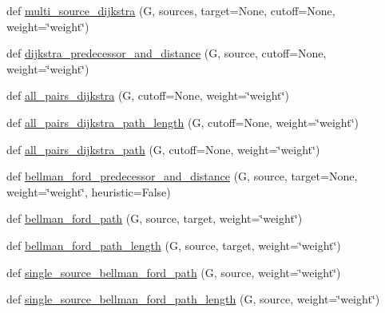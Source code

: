 \begin{DoxyCompactItemize}
def \hyperlink{namespacenetworkx_1_1algorithms_1_1shortest__paths_1_1weighted_aee5f81cc7c6f46d1f11ec440ee37b930}{multi\+\_\+source\+\_\+dijkstra} (G, sources, target=None, cutoff=None, weight=\char`\"{}weight\char`\"{})
\item 
def \hyperlink{namespacenetworkx_1_1algorithms_1_1shortest__paths_1_1weighted_aa626ff4e7f1c29c88f1fd9711b33b1ba}{dijkstra\+\_\+predecessor\+\_\+and\+\_\+distance} (G, source, cutoff=None, weight=\char`\"{}weight\char`\"{})
\item 
def \hyperlink{namespacenetworkx_1_1algorithms_1_1shortest__paths_1_1weighted_a2307507504e391a1bc60e53564f0066a}{all\+\_\+pairs\+\_\+dijkstra} (G, cutoff=None, weight=\char`\"{}weight\char`\"{})
\item 
def \hyperlink{namespacenetworkx_1_1algorithms_1_1shortest__paths_1_1weighted_acca70fc51bf6bb5ad9d9e41e4451e5e6}{all\+\_\+pairs\+\_\+dijkstra\+\_\+path\+\_\+length} (G, cutoff=None, weight=\char`\"{}weight\char`\"{})
\item 
def \hyperlink{namespacenetworkx_1_1algorithms_1_1shortest__paths_1_1weighted_ab315738b5d893fe6d12f4d7396a4c777}{all\+\_\+pairs\+\_\+dijkstra\+\_\+path} (G, cutoff=None, weight=\char`\"{}weight\char`\"{})
\item 
def \hyperlink{namespacenetworkx_1_1algorithms_1_1shortest__paths_1_1weighted_a3e0a3e61a52f47e5fd682a4df34aad6c}{bellman\+\_\+ford\+\_\+predecessor\+\_\+and\+\_\+distance} (G, source, target=None, weight=\char`\"{}weight\char`\"{}, heuristic=False)
\item 
def \hyperlink{namespacenetworkx_1_1algorithms_1_1shortest__paths_1_1weighted_a9e342fe36f78d22f22315472f5e4845a}{bellman\+\_\+ford\+\_\+path} (G, source, target, weight=\char`\"{}weight\char`\"{})
\item 
def \hyperlink{namespacenetworkx_1_1algorithms_1_1shortest__paths_1_1weighted_a985b3fe02368560b5bfcf3506ab479f7}{bellman\+\_\+ford\+\_\+path\+\_\+length} (G, source, target, weight=\char`\"{}weight\char`\"{})
\item 
def \hyperlink{namespacenetworkx_1_1algorithms_1_1shortest__paths_1_1weighted_a7193ad94b7b96b526d6f504fbd9928d3}{single\+\_\+source\+\_\+bellman\+\_\+ford\+\_\+path} (G, source, weight=\char`\"{}weight\char`\"{})
\item 
def \hyperlink{namespacenetworkx_1_1algorithms_1_1shortest__paths_1_1weighted_ac0621107112bb024e746959e343f53e3}{single\+\_\+source\+\_\+bellman\+\_\+ford\+\_\+path\+\_\+length} (G, source, weight=\char`\"{}weight\char`\"{})
\item 

\end{DoxyCompactItemize}
